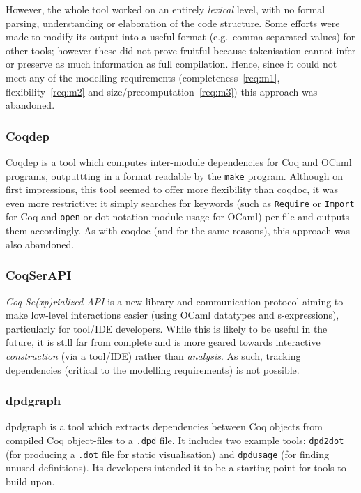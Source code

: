 However, the whole tool worked on an entirely \emph{lexical} level, with no
formal parsing, understanding or elaboration of the code structure. Some efforts
were made to modify its output into a useful format (e.g.\ comma-separated
values) for other tools; however these did not prove fruitful because
tokenisation cannot infer or preserve as much information as full compilation.
Hence, since it could not meet any of the modelling requirements
(completeness~\ref{req:m1}, flexibility~\ref{req:m2} and
size/precomputation~\ref{req:m3}) this approach was abandoned.

\subsubsection{Coqdep}
Coqdep is a tool which computes inter-module dependencies for Coq and
OCaml programs, outputtting in a format readable by the \texttt{make} program.
Although on first impressions, this tool seemed to offer more flexibility than
coqdoc, it was even more restrictive: it simply searches for keywords (such as
\texttt{Require} or \texttt{Import} for Coq  and \texttt{open} or dot-notation
module usage for OCaml) per file and outputs them accordingly.  As with coqdoc
(and for the same reasons), this approach was also abandoned.

\subsubsection{CoqSerAPI}

\emph{Coq Se(xp)rialized API} is a new library and communication protocol
aiming to make low-level interactions easier (using OCaml datatypes and
s-expressions), particularly for tool/IDE developers. While this is likely to
be useful in the future, it is still far from complete and is more geared
towards interactive \emph{construction} (via a tool/IDE) rather than
\emph{analysis}. As such, tracking dependencies (critical to the modelling
requirements) is not possible.

\subsubsection{dpdgraph}

dpdgraph is a tool which extracts dependencies between Coq objects from compiled
Coq object-files to a \texttt{.dpd} file. It includes two example tools:
\texttt{dpd2dot} (for producing a \texttt{.dot} file for static visualisation)
and \texttt{dpdusage} (for finding unused definitions). Its developers intended
it to be a starting point for tools to build upon.

